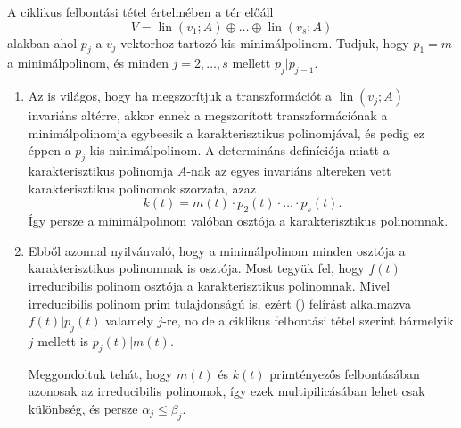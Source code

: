 \documentclass[9pt, a4paper, showtrims]{memoir}
\makeatletter
\renewenvironment{proof}[1][\proofname]
    {\par\pushQED{\qed}%
    \normalfont \topsep6\p@\@plus6\p@\relax
    \trivlist
    \item[\hskip\labelsep
        \itshape
    #1\@addpunct{:}]\ignorespaces}
    {\popQED\endtrivlist\@endpefalse}
\theoremstyle{plain}
\theoremstyle{remark}
\theoremstyle{definition}
\DeclareMathOperator{\lin}{lin}
\makeatother
\begin{document}
\begin{proof}
    A ciklikus felbontási tétel értelmében a tér előáll
    \[
        V=
        \lin\left( v_1;A \right)
        \oplus\ldots\oplus
        \lin\left( v_s;A \right)
    \]
    alakban ahol $p_j$ a $v_j$ vektorhoz tartozó kis minimálpolinom.
    Tudjuk, hogy $p_1=m$ a minimálpolinom,
    és minden $j=2,\ldots,s$ mellett $p_j|p_{j-1}$.
    \begin{enumerate}
        \item 
    Az is világos, hogy ha megszorítjuk a transzformációt a 
    $\lin\left( v_j;A \right)$ invariáns altérre, akkor ennek a megszorított transzformációnak
    a minimálpolinomja egybeesik a karakterisztikus polinomjával, és pedig ez éppen a $p_j$
    kis minimálpolinom.
    A determináns definíciója miatt a karakterisztikus polinomja $A$-nak az egyes invariáns altereken vett karakterisztikus polinomok szorzata, azaz
    \[
        k\left( t \right)
        =
        m\left( t \right)\cdot
        p_2\left( t \right)\cdot\ldots\cdot p_s\left( t \right).
        \tag{\dag}
    \]
    Így persze a minimálpolinom valóban osztója a karakterisztikus polinomnak.
    
        \item
    Ebből azonnal nyilvánvaló, 
    hogy a minimálpolinom minden osztója a karakterisztikus polinomnak is osztója.
    Most tegyük fel, hogy $f\left( t \right)$ irreducibilis polinom osztója a karakterisztikus
    polinomnak.
    Mivel irreducibilis polinom prim tulajdonságú is, 
    ezért (\dag) felírást alkalmazva $f\left( t \right)|p_j\left( t \right)$ valamely
    $j$-re, 
    no de a ciklikus felbontási tétel szerint bármelyik $j$ mellett is
    $p_j\left( t \right)|m\left( t \right)$.

    Meggondoltuk tehát, hogy $m\left( t \right)$ és $k\left( t \right)$
    primtényezős felbontásában azonosak az irreducibilis polinomok,
    így ezek multipilicásában lehet csak különbség, és persze $\alpha_j\leq\beta_j$.


\end{enumerate}
\end{proof}
\end{document}
